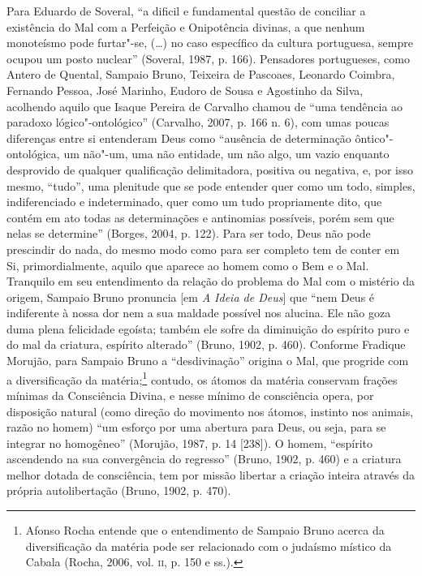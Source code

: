 Para Eduardo de Soveral, “a dificil e fundamental questão de
conciliar a existência do Mal com a Perfeição e Onipotência
divinas, a que nenhum monoteísmo pode furtar"-se, (\ldots{}) no caso
específico da cultura portuguesa, sempre ocupou um posto
nuclear” (Soveral, 1987, p. 166). Pensadores portugueses, como
Antero de Quental, Sampaio Bruno, Teixeira de Pascoaes, Leonardo
Coimbra, Fernando Pessoa, José Marinho, Eudoro de Sousa e
Agostinho da Silva, acolhendo aquilo que Isaque Pereira de
Carvalho chamou de “uma tendência ao paradoxo lógico"-ontológico”
(Carvalho, 2007, p. 166 n. 6), com umas poucas diferenças entre
si entenderam Deus como “ausência de determinação
ôntico"-ontológica, um não"-um, uma não entidade, um não algo, um
vazio enquanto desprovido de qualquer qualificação delimitadora,
positiva ou negativa, e, por isso mesmo, ``tudo'', uma plenitude
que se pode entender quer como um todo, simples, indiferenciado
e indeterminado, quer como um tudo propriamente dito, que contém
em ato todas as determinações e antinomias possíveis, porém sem
que nelas se determine” (Borges, 2004, p. 122). Para ser todo,
Deus não pode prescindir do nada, do mesmo modo como para ser
completo tem de conter em Si, primordialmente, aquilo que
aparece ao homem como o Bem e o Mal. Tranquilo em seu
entendimento da relação do problema do Mal com o mistério da
origem, Sampaio Bruno pronuncia [em \emph{A Ideia de Deus}]
que “nem Deus é indiferente à nossa dor nem a sua maldade
possível nos alucina. Ele não goza duma plena felicidade
egoísta; também ele sofre da diminuição do espírito puro e do
mal da criatura, espírito alterado” (Bruno, 1902, p. 460).
Conforme Fradique Morujão, para Sampaio Bruno a “desdivinação”
origina o Mal, que progride com a diversificação da
matéria;\footnote{ Afonso Rocha entende que o entendimento de
Sampaio Bruno acerca da diversificação da matéria pode ser
relacionado com o judaísmo místico da Cabala (Rocha, 2006, vol.
\textsc{ii}, p. 150 e ss.).} contudo, os átomos da matéria conservam
frações mínimas da Consciência Divina, e nesse mínimo de
consciência opera, por disposição natural (como direção do
movimento nos átomos, instinto nos animais, razão no homem) “um
esforço por uma abertura para Deus, ou seja, para se integrar no
homogêneo” (Morujão, 1987, p. 14 [238]). O homem, “espírito
ascendendo na sua convergência do regresso” (Bruno, 1902, p.
460) e a criatura melhor dotada de consciência, tem por missão
libertar a criação inteira através da própria autolibertação
(Bruno, 1902, p. 470).

